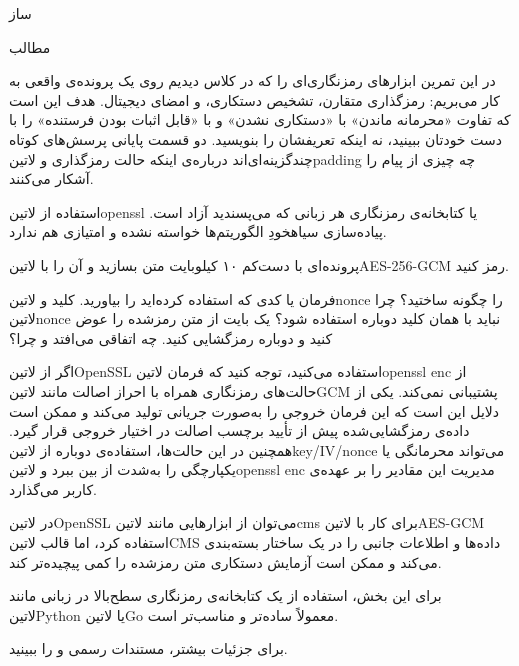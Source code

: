 \documentclass{../is-assignment}
\begin{document}
‌ساز

‌مطالب


در این تمرین ابزارهای رمزنگاری‌ای را که در کلاس دیدیم روی یک پرونده‌ی واقعی به کار می‌بریم:
رمزگذاری متقارن، تشخیص دستکاری، و امضای دیجیتال.
هدف این است که تفاوت «محرمانه ماندن» با «دستکاری نشدن» و با «قابل اثبات بودن فرستنده» را با دست خودتان ببینید،
نه اینکه تعریفشان را بنویسید.
دو قسمت پایانی پرسش‌های کوتاه چندگزینه‌ای‌اند
درباره‌ی اینکه حالت رمزگذاری و ‌لاتین{padding} چه چیزی از پیام را آشکار می‌کنند.

استفاده از ‌لاتین{openssl} یا کتابخانه‌ی رمزنگاری هر زبانی که می‌پسندید آزاد است.
پیاده‌سازی ‌سیاه{خودِ} الگوریتم‌ها خواسته نشده و امتیازی هم ندارد.


پرونده‌ای با دست‌کم ۱۰ کیلوبایت متن بسازید و آن را با
‌لاتین{AES-256-GCM} رمز کنید.

 فرمان یا کدی که استفاده کرده‌اید را بیاورید.
 کلید و ‌لاتین{nonce} را چگونه ساختید؟
      چرا ‌لاتین{nonce} نباید با همان کلید دوباره استفاده شود؟
 یک بایت از متن رمزشده را عوض کنید و دوباره رمزگشایی کنید.
      چه اتفاقی می‌افتد و چرا؟

\newpage

اگر از ‌لاتین{OpenSSL} استفاده می‌کنید، توجه کنید که فرمان
‌لاتین{openssl enc} از حالت‌های رمزنگاری همراه با احراز اصالت
مانند ‌لاتین{GCM} پشتیبانی نمی‌کند.
یکی از دلایل این است که این فرمان خروجی را به‌صورت جریانی تولید می‌کند
و ممکن است داده‌ی رمزگشایی‌شده پیش از تأیید برچسب اصالت در اختیار
خروجی قرار گیرد.
همچنین در این حالت‌ها، استفاده‌ی دوباره از
‌لاتین{key/IV/nonce}
می‌تواند محرمانگی یا یکپارچگی را به‌شدت از بین ببرد و
‌لاتین{openssl enc}
مدیریت این مقادیر را بر عهده‌ی کاربر می‌گذارد.

در ‌لاتین{OpenSSL} می‌توان از ابزارهایی مانند
‌لاتین{cms} برای کار با ‌لاتین{AES-GCM} استفاده کرد،
اما قالب ‌لاتین{CMS} داده‌ها و اطلاعات جانبی را در یک ساختار
بسته‌بندی می‌کند و ممکن است آزمایش دستکاری متن رمزشده را
کمی پیچیده‌تر کند.

برای این بخش، استفاده از یک کتابخانه‌ی رمزنگاری سطح‌بالا در زبانی مانند
‌لاتین{Python} یا ‌لاتین{Go} معمولاً ساده‌تر و مناسب‌تر است.

برای جزئیات بیشتر، مستندات رسمی
و
را ببینید.
\end{document}
